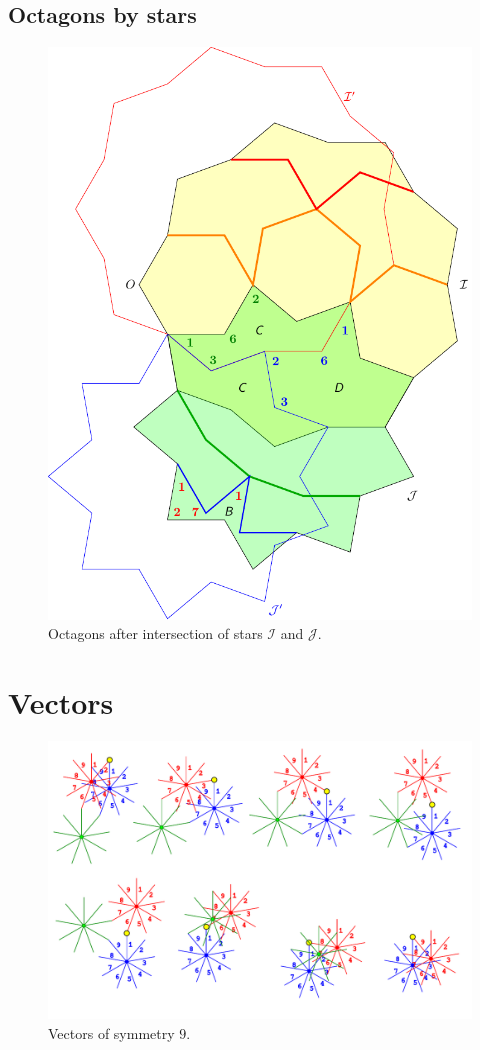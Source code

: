 \documentclass[11pt]{article}
\begin{document}
\subsection{Octagons by stars}

\begin{figure}[H]
\centering
\includegraphics[scale=1]{octagons-9}
\caption{Octagons after intersection of stars $\mathcal{I}$ and $\mathcal{J}$.}
\label{fig:octagons-9}
\end{figure}

\section{Vectors}
\begin{figure}[H]
\centering
\includegraphics[scale=0.85]{9}
\caption{Vectors of symmetry $9$.}
\label{fig:9}
\end{figure}
\end{document}

